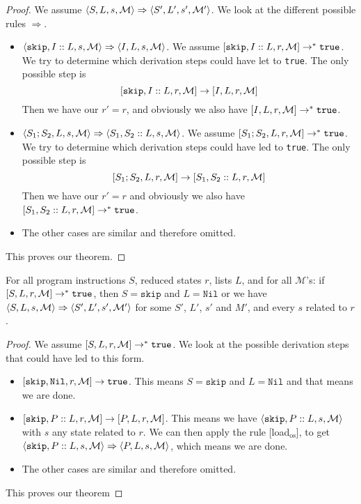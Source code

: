 \begin{proof}
We assume $\langle S, L, s, \mathcal{M} \rangle \Rightarrow \langle S', L', s', \mathcal{M'} \rangle$. We look at the different possible rules $\Rightarrow$. 
\begin{itemize}[noitemsep]
    \item $\langle \texttt{skip}, I::L, s, \mathcal{M} \rangle \Rightarrow \langle I, L, s, \mathcal{M} \rangle$. We assume $[ \texttt{skip}, I::L, r, \mathcal{M} ] \to ^* \texttt{true}$. We try to determine which derivation steps could have let to \texttt{true}. The only possible step is 
    $$[ \texttt{skip}, I::L, r, \mathcal{M} ]\to [ I, L, r, \mathcal{M} ]$$
    Then we have our $r' = r$, and obviously we also have $[ I, L, r, \mathcal{M} ] \to^* \texttt{true}$.
    \item $\langle S_1; S_2, L, s, \mathcal{M} \rangle \Rightarrow \langle S_1, S_2::L, s, \mathcal{M} \rangle$. We assume $[ S_1; S_2, L, r, \mathcal{M} ] \to ^* \texttt{true}$. We try to determine which derivation steps could have led to \texttt{true}. The only possible step is 
    $$[ S_1; S_2, L, r, \mathcal{M} ] \to [ S_1, S_2::L, r, \mathcal{M} ]$$
    Then we have our $r' = r$ and obviously we also have $[ S_1, S_2::L, r, \mathcal{M} ] \to^* \texttt{true}$.
    \item The other cases are similar and therefore omitted.
\end{itemize}
This proves our theorem.
\end{proof}


\begin{theorem}
\label{progressb}
For all program instructions $S$, reduced states $r$, lists $L$, and for all $\mathcal{M}$'s: if $[ S, L, r, \mathcal{M} ] \to^* \texttt{true}$, then $S = \texttt{skip}$ and $L = \texttt{Nil}$ or we have $\langle S, L, s, \mathcal{M} \rangle \Rightarrow \langle S', L', s', \mathcal{M'} \rangle$ for some $S'$, $L'$, $s'$ and $M'$, and every $s$ related to $r$.
\end{theorem}

\begin{proof}
We assume $[ S, L, r, \mathcal{M} ] \to^* \texttt{true}$. We look at the possible derivation steps that could have led to this form. 
\begin{itemize}[noitemsep]
    \item $[ \texttt{skip}, \texttt{Nil}, r, \mathcal{M} ] \to \texttt{true}$. This means $S = \texttt{skip}$ and $L = \texttt{Nil}$ and that means we are done.
    \item $[ \texttt{skip}, P::L, r, \mathcal{M} ] \to [ P, L, r, \mathcal{M} ]$. This means we have $\langle \texttt{skip}, P::L, s, \mathcal{M} \rangle$ with $s$ any state related to $r$. We can then apply the rule [load$_{\textrm{os}}$], to get $\langle \texttt{skip}, P::L, s, \mathcal{M} \rangle \Rightarrow \langle P, L, s, \mathcal{M} \rangle$, which means we are done.
    \item The other cases are similar and therefore omitted.
\end{itemize}
This proves our theorem
\end{proof}



